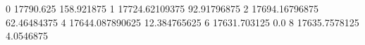 0 17790.625 158.921875
1 17724.62109375 92.91796875
2 17694.16796875 62.46484375
4 17644.087890625 12.384765625
6 17631.703125 0.0
8 17635.7578125 4.0546875
